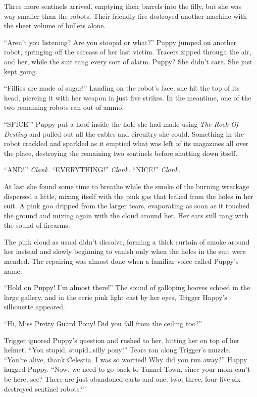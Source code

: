 Three more sentinels arrived, emptying their barrels into the filly, but she was way smaller than the robots. Their friendly fire destroyed another machine with the sheer volume of bullets alone.

``Aren't you listening? Are you stoopid or what?'' Puppy jumped on another robot, springing off the carcass of her last victim. Tracers zipped through the air, and her, while the suit rang every sort of alarm. Puppy? She didn't care. She just kept going.

``Fillies are made of sugar!'' Landing on the robot's face, she hit the top of its head, piercing it with her weapon in just five strikes. In the meantime, one of the two remaining robots ran out of ammo.

``SPICE!'' Puppy put a hoof inside the hole she had made using \emph{The Rock Of Destiny} and pulled out all the cables and circuitry she could. Something in the robot crackled and sparkled as it emptied what was left of its magazines all over the place, destroying the remaining two sentinels before shutting down itself.

``AND!'' \emph{Clank.} ``EVERYTHING!'' \emph{Clank.} ``NICE!'' \emph{Clank.}

At last she found some time to breathe while the smoke of the burning wreckage dispersed a little, mixing itself with the pink gas that leaked from the holes in her suit. A pink goo dripped from the larger tears, evaporating as soon as it touched the ground and mixing again with the cloud around her. Her ears still rang with the sound of firearms.

The pink cloud as usual didn't dissolve, forming a thick curtain of smoke around her instead and slowly beginning to vanish only when the holes in the suit were mended. The repairing was almost done when a familiar voice called Puppy's name.

``Hold on Puppy! I'm almost there!'' The sound of galloping hooves echoed in the large gallery, and in the eerie pink light cast by her eyes, Trigger Happy's silhouette appeared.

``Hi, Miss Pretty Guard Pony! Did you fall from the ceiling too?''

Trigger ignored Puppy's question and rushed to her, hitting her on top of her helmet. ``You stupid, stupid\dots silly pony!'' Tears ran along Trigger's muzzle. ``You're alive, thank Celestia. I was so worried! Why did you run away?'' Happy hugged Puppy. ``Now, we need to go back to Tunnel Town, since your mom can't be here, see? There are just abandoned carts and one, two, three, four-five-six destroyed sentinel robots?''

